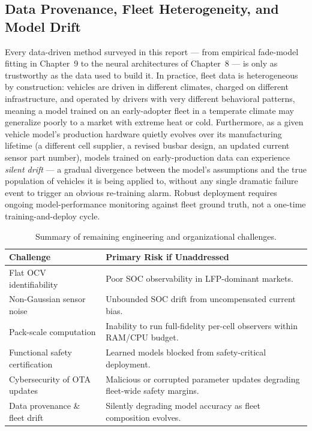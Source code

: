 \subsection{Data Provenance, Fleet Heterogeneity, and Model Drift}
\label{subsec:14_data_provenance}

Every data-driven method surveyed in this report — from empirical fade-model fitting in Chapter~9 to the neural architectures of Chapter~8 — is only as trustworthy as the data used to build it. In practice, fleet data is heterogeneous by construction: vehicles are driven in different climates, charged on different infrastructure, and operated by drivers with very different behavioral patterns, meaning a model trained on an early-adopter fleet in a temperate climate may generalize poorly to a market with extreme heat or cold. Furthermore, as a given vehicle model's production hardware quietly evolves over its manufacturing lifetime (a different cell supplier, a revised busbar design, an updated current sensor part number), models trained on early-production data can experience \emph{silent drift} — a gradual divergence between the model's assumptions and the true population of vehicles it is being applied to, without any single dramatic failure event to trigger an obvious re-training alarm. Robust deployment requires ongoing model-performance monitoring against fleet ground truth, not a one-time training-and-deploy cycle.

\begin{table}[htbp]
\centering
\caption{Summary of remaining engineering and organizational challenges.}
\label{tab:14_challenges_summary}
\renewcommand{\arraystretch}{1.4}
\begin{tabularx}{\textwidth}{@{}l X@{}}
\toprule
\textbf{Challenge} & \textbf{Primary Risk if Unaddressed} \\
\midrule
Flat OCV identifiability & Poor SOC observability in LFP-dominant markets. \\
Non-Gaussian sensor noise & Unbounded SOC drift from uncompensated current bias. \\
Pack-scale computation & Inability to run full-fidelity per-cell observers within RAM/CPU budget. \\
Functional safety certification & Learned models blocked from safety-critical deployment. \\
Cybersecurity of OTA updates & Malicious or corrupted parameter updates degrading fleet-wide safety margins. \\
Data provenance \& fleet drift & Silently degrading model accuracy as fleet composition evolves. \\
\bottomrule
\end{tabularx}
\end{table}

